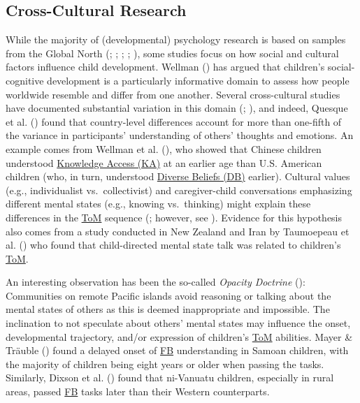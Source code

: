 \documentclass[
]{scrbook}
\begin{document}
\subsection{Cross-Cultural Research}\label{cross-cultural-research}

While the majority of (developmental) psychology research is based on samples from the Global North (; ; ; ; ), some studies focus on how social and cultural factors influence child development. Wellman () has argued that children's social-cognitive development is a particularly informative domain to assess how people worldwide resemble and differ from one another. Several cross-cultural studies have documented substantial variation in this domain (; ), and indeed, Quesque et al. () found that country-level differences account for more than one-fifth of the variance in participants' understanding of others' thoughts and emotions. An example comes from Wellman et al. (), who showed that Chinese children understood \hyperref[acronyms_KA]{Knowledge Access (KA)} at an earlier age than U.S. American children (who, in turn, understood \hyperref[acronyms_DB]{Diverse Beliefs (DB)} earlier). Cultural values (e.g., individualist vs.~collectivist) and caregiver-child conversations emphasizing different mental states (e.g., knowing vs.~thinking) might explain these differences in the \hyperref[acronyms_ToM]{ToM} sequence (; however, see ). Evidence for this hypothesis also comes from a study conducted in New Zealand and Iran by Taumoepeau et al. () who found that child-directed mental state talk was related to children's \hyperref[acronyms_ToM]{ToM}.

An interesting observation has been the so-called \emph{Opacity Doctrine} (): Communities on remote Pacific islands avoid reasoning or talking about the mental states of others as this is deemed inappropriate and impossible. The inclination to not speculate about others' mental states may influence the onset, developmental trajectory, and/or expression of children's \hyperref[acronyms_ToM]{ToM} abilities. Mayer \& Träuble () found a delayed onset of \hyperref[acronyms_FB]{FB} understanding in Samoan children, with the majority of children being eight years or older when passing the tasks. Similarly, Dixson et al. () found that ni-Vanuatu children, especially in rural areas, passed \hyperref[acronyms_FB]{FB} tasks later than their Western counterparts.
\end{document}

